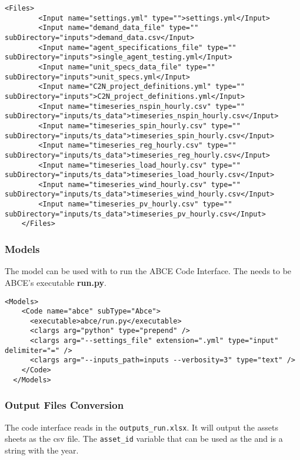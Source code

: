 \begin{lstlisting}[style=XML]
    <Files>
        <Input name="settings.yml" type="">settings.yml</Input>
        <Input name="demand_data_file" type="" subDirectory="inputs">demand_data.csv</Input>
        <Input name="agent_specifications_file" type="" subDirectory="inputs">single_agent_testing.yml</Input>
        <Input name="unit_specs_data_file" type="" subDirectory="inputs">unit_specs.yml</Input>
        <Input name="C2N_project_definitions.yml" type="" subDirectory="inputs">C2N_project_definitions.yml</Input>
        <Input name="timeseries_nspin_hourly.csv" type="" subDirectory="inputs/ts_data">timeseries_nspin_hourly.csv</Input>
        <Input name="timeseries_spin_hourly.csv" type="" subDirectory="inputs/ts_data">timeseries_spin_hourly.csv</Input>
        <Input name="timeseries_reg_hourly.csv" type="" subDirectory="inputs/ts_data">timeseries_reg_hourly.csv</Input>
        <Input name="timeseries_load_hourly.csv" type="" subDirectory="inputs/ts_data">timeseries_load_hourly.csv</Input>
        <Input name="timeseries_wind_hourly.csv" type="" subDirectory="inputs/ts_data">timeseries_wind_hourly.csv</Input>
        <Input name="timeseries_pv_hourly.csv" type="" subDirectory="inputs/ts_data">timeseries_pv_hourly.csv</Input>
    </Files>
\end{lstlisting}

\subsubsection{Models}

The  model can be used with
 to run the ABCE Code Interface. The  needs to be ABCE's executable \textbf{run.py}.

\begin{lstlisting}[style=XML]
  <Models>
    <Code name="abce" subType="Abce">
      <executable>abce/run.py</executable>
      <clargs arg="python" type="prepend" />
      <clargs arg="--settings_file" extension=".yml" type="input" delimiter="=" />
      <clargs arg="--inputs_path=inputs --verbosity=3" type="text" />
    </Code>
  </Models>
\end{lstlisting}

\subsubsection{Output Files Conversion}

The code interface reads in the \texttt{outputs\ABCE_run\outputs.xlsx}. 
It will output the assets sheets as the csv file. The \texttt{asset_id} 
variable that can be used as the  and is a
string with the year. 

